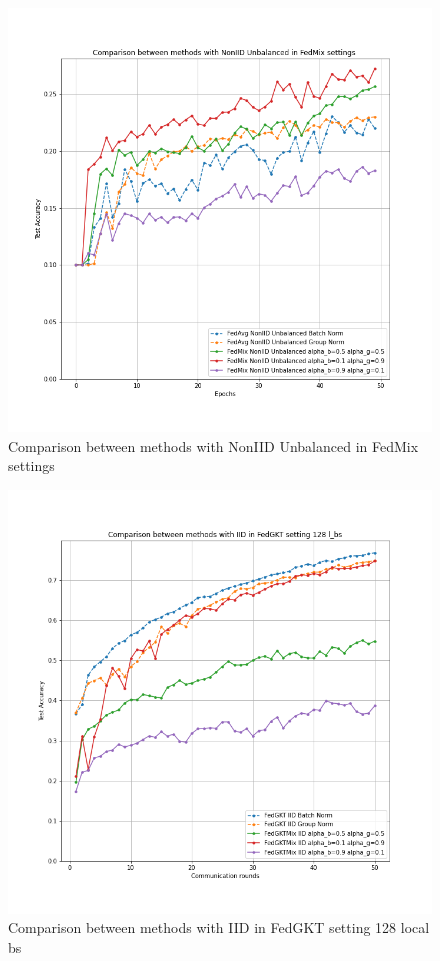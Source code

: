 \documentclass[conference]{IEEEtran}
\begin{document}
\begin{figure}[htb]
    \centering
    \includegraphics[width=\columnwidth]{Images/Comparison between methods with NonIID Unbalanced in FedMix settings.png}
    \caption{Comparison between methods with NonIID Unbalanced in FedMix settings}
    \label{fig:appendix3}
\end{figure}
\begin{figure}[htb]
    \centering
    \includegraphics[width=\columnwidth]{Images/Comparison between methods with IID in FedGKT setting 128 l_bs.png}
    \caption{Comparison between methods with IID in FedGKT setting 128 local bs}
    \label{fig:appendix4}
\end{figure}
\end{document}
